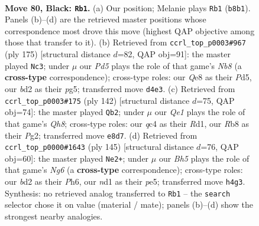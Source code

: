 \documentclass[11pt]{article}
\begin{document}
\clearpage

\begin{figure}[p]\centering
\begin{subfigure}{0.46\textwidth}\centering
\resizebox{\linewidth}{!}{%
\newchessgame
\chessboard[
  setfen={1r2q3/6k1/8/P1p2p2/2QpnPpb/4P3/R2B4/3N1K2 b - - 4 80},
  showmover=false,
  pgfstyle=straightmove, color=movearrow, markmove={b8-b1}
]}
\caption{}
\end{subfigure}\hfill
\begin{subfigure}{0.46\textwidth}\centering
\resizebox{\linewidth}{!}{%
\newchessgame
\chessboard[
  setfen={1r6/8/kp2p3/3pP1P1/pQp2P2/P3B2R/2q5/1n5K b - - 3 88},
  showmover=false,
  pgfstyle=straightmove, color=movearrow, markmove={b1-c3}
]}
\caption{}
\end{subfigure}
\\[4pt]
\begin{subfigure}{0.46\textwidth}\centering
\resizebox{\linewidth}{!}{%
\newchessgame
\chessboard[
  setfen={7Q/8/pp2q1k1/8/PP2N2p/3r1PbP/3p2P1/3R3K w - - 5 72},
  showmover=false,
  pgfstyle=straightmove, color=movearrow, markmove={h8-b2}
]}
\caption{}
\end{subfigure}\hfill
\begin{subfigure}{0.46\textwidth}\centering
\resizebox{\linewidth}{!}{%
\newchessgame
\chessboard[
  setfen={8/5Qpk/4p2p/3pP3/7q/3NBPn1/6P1/6K1 b - - 0 73},
  showmover=false,
  pgfstyle=straightmove, color=movearrow, markmove={g3-e2}
]}
\caption{}
\end{subfigure}
\caption{\textbf{Move 80, Black: \texttt{Rb1}.} (a) Our position; Melanie plays \texttt{Rb1} (\texttt{b8b1}). Panels (b)--(d) are the retrieved master positions whose correspondence most drove this move (highest QAP objective among those that transfer to it). (b) Retrieved from \texttt{ccrl\_top\_p0003\#967} (ply 175) [structural distance $d$=82, QAP obj=91]: the master played \texttt{Nc3}; under $\mu$ our \emph{Pd5} plays the role of that game's \emph{Nb8} (a \textbf{cross-type} correspondence); cross-type roles: our \emph{Q}e8 as their \emph{P}d5, our \emph{b}d2 as their \emph{p}g5; transferred move \texttt{d4e3}. (c) Retrieved from \texttt{ccrl\_top\_p0003\#175} (ply 142) [structural distance $d$=75, QAP obj=74]: the master played \texttt{Qb2}; under $\mu$ our \emph{Qe1} plays the role of that game's \emph{Qh8}; cross-type roles: our \emph{q}c4 as their \emph{R}d1, our \emph{R}b8 as their \emph{P}g2; transferred move \texttt{e8d7}. (d) Retrieved from \texttt{ccrl\_top\_p0000\#1643} (ply 145) [structural distance $d$=76, QAP obj=60]: the master played \texttt{Ne2+}; under $\mu$ our \emph{Bh5} plays the role of that game's \emph{Ng6} (a \textbf{cross-type} correspondence); cross-type roles: our \emph{b}d2 as their \emph{P}h6, our \emph{n}d1 as their \emph{p}e5; transferred move \texttt{h4g3}. Synthesis: no retrieved analog transferred to \texttt{Rb1} -- the \texttt{search} selector chose it on value (material / mate); panels (b)--(d) show the strongest nearby analogies.}
\label{fig:thought-m159}
\end{figure}
\end{document}
